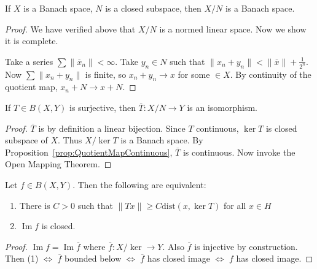 
\begin{proposition}[QuotientSpace]
	\label{prop:Quotientspace}
	If $X$ is a Banach space, $N$ is a closed subspace, then $X / N$ is a Banach space.
\end{proposition}
\begin{proof}
	We have verified above that $X / N$ is a normed linear space. Now we show it is complete.

	Take a series $\sum \|\overline{x}_n \| < \infty $. Take $y_n \in N$ such that $\|x_n + y_n\|< \|\overline{x} \| + \frac{1}{2^n}$. Now $\sum \|x_n + y_n\|$ is finite, so $x_n + y_n \to x$ for some $ \in X$. By continuity of the quotient map, $x_n + N \to  x + N$.

	
\end{proof}



\begin{corollary}
	\label{cor:QuotientIsomorphism}
	If $T \in B(X, Y)$ is surjective, then $\overline{T} : X / N \to  Y$ is an isomorphism.
\end{corollary}
\begin{proof}
	$\overline{T} $ is by definition a linear bijection.
	Since $T$ continuous, $\operatorname{ker} T$ is closed subspace of $X$. Thus $X / \operatorname{ker} T $ is a Banach space. By Proposition~\ref{prop:QuotientMapContinuous}, $\overline{T} $ is continuous. Now invoke the Open Mapping Theorem.
\end{proof}

\begin{lemma}
	\label{lem:RangeClosedBoundedBelow}
	Let $f \in B(X, Y)$. Then the following are equivalent:
	\begin{enumerate}
		\item There is $C >0$ such that $\|T x\| \ge C \text{dist}(x, \operatorname{ker} T)$ for all $x \in H$
		\item $\operatorname{Im} f$ is closed.
	\end{enumerate}
\end{lemma}
\begin{proof}
	$\operatorname{Im} f = \operatorname{Im} \overline{f} $ where $\overline{f} : X / \operatorname{ker}  \to  Y$. Also $\overline{f} $ is injective by construction. Then (1)  $\iff $ $\overline{f} $ bounded below $\iff $ $\overline{f} $ has closed image $\iff $ $f$ has closed image.
\end{proof}

